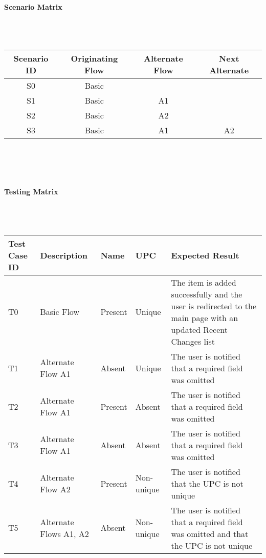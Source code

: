 \documentclass{article}
\begin{document}
\paragraph{Scenario Matrix}~\\ \\
\begin{tabular}{ c  c  c  c }
\hline
Scenario ID & Originating Flow & Alternate Flow & Next Alternate\\
\hline
\hline
S0 & Basic &  & \\
\hline
S1 & Basic & A1 & \\
\hline
S2 & Basic & A2 & \\
\hline
S3 & Basic & A1 & A2\\
\hline
\end{tabular}\\
~\\
~\\
\paragraph{Testing Matrix}~\\ \\
\begin{tabular}{ p{0.5in}  p{1.9in}  p{0.4in}  p{0.7in}  p{2in} }
\hline
Test Case ID & Description & Name & UPC & Expected Result\\
\hline
\hline
T0 & Basic Flow & Present & Unique & The item is added successfully and the user is redirected to the main page with an updated Recent Changes list\\
\hline
T1 & Alternate Flow A1 & Absent & Unique & The user is notified that a required field was omitted\\
\hline
T2 & Alternate Flow A1 & Present & Absent & The user is notified that a required field was omitted\\
\hline
T3 & Alternate Flow A1 & Absent & Absent & The user is notified that a required field was omitted\\
\hline
T4 & Alternate Flow A2 & Present & Non-unique & The user is notified that the UPC is not unique\\
\hline
T5 & Alternate Flows A1, A2 & Absent & Non-unique & The user is notified that a required field was omitted and that the UPC is not unique\\
\hline
\end{tabular}\\
~\\
~\\
\end{document}
